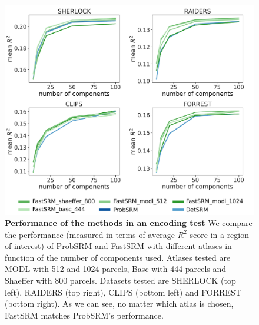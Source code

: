 \begin{figure}
\centering
\includegraphics[scale=0.34]{figures/srm/perfs.pdf}
\caption{\textbf{Performance of the methods in an encoding test} We compare the performance (measured in terms of average $R^2$ score in a region of interest) of ProbSRM and FastSRM with different atlases in function of the number of components used. Atlases tested are MODL with 512 and 1024 parcels, Basc with 444 parcels and Shaeffer with 800 parcels. Datasets tested are SHERLOCK (top left), RAIDERS (top right), CLIPS (bottom left) and FORREST (bottom right). 
As we can see, no matter which atlas is chosen, FastSRM matches ProbSRM's performance.}
\label{fig:mean_r2_score}
\end{figure}

